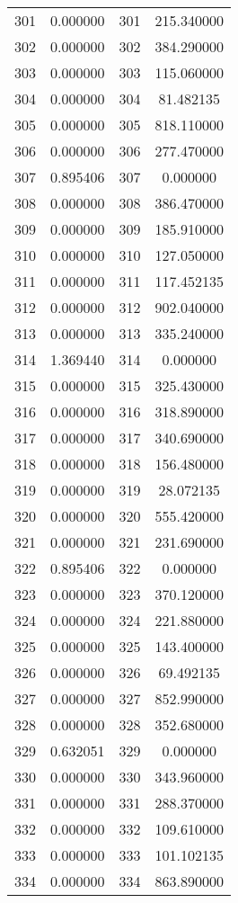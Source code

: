 \documentclass[12pt]{article}
\begin{document}
\begin{longtable}{@{}cccc@{}}
301 & 0.000000 & 301 & 215.340000 \\
302 & 0.000000 & 302 & 384.290000 \\
303 & 0.000000 & 303 & 115.060000 \\
304 & 0.000000 & 304 & 81.482135 \\
305 & 0.000000 & 305 & 818.110000 \\
306 & 0.000000 & 306 & 277.470000 \\
307 & 0.895406 & 307 & 0.000000 \\
308 & 0.000000 & 308 & 386.470000 \\
309 & 0.000000 & 309 & 185.910000 \\
310 & 0.000000 & 310 & 127.050000 \\
311 & 0.000000 & 311 & 117.452135 \\
312 & 0.000000 & 312 & 902.040000 \\
313 & 0.000000 & 313 & 335.240000 \\
314 & 1.369440 & 314 & 0.000000 \\
315 & 0.000000 & 315 & 325.430000 \\
316 & 0.000000 & 316 & 318.890000 \\
317 & 0.000000 & 317 & 340.690000 \\
318 & 0.000000 & 318 & 156.480000 \\
319 & 0.000000 & 319 & 28.072135 \\
320 & 0.000000 & 320 & 555.420000 \\
321 & 0.000000 & 321 & 231.690000 \\
322 & 0.895406 & 322 & 0.000000 \\
323 & 0.000000 & 323 & 370.120000 \\
324 & 0.000000 & 324 & 221.880000 \\
325 & 0.000000 & 325 & 143.400000 \\
326 & 0.000000 & 326 & 69.492135 \\
327 & 0.000000 & 327 & 852.990000 \\
328 & 0.000000 & 328 & 352.680000 \\
329 & 0.632051 & 329 & 0.000000 \\
330 & 0.000000 & 330 & 343.960000 \\
331 & 0.000000 & 331 & 288.370000 \\
332 & 0.000000 & 332 & 109.610000 \\
333 & 0.000000 & 333 & 101.102135 \\
334 & 0.000000 & 334 & 863.890000 \\

\end{longtable}
\end{document}
